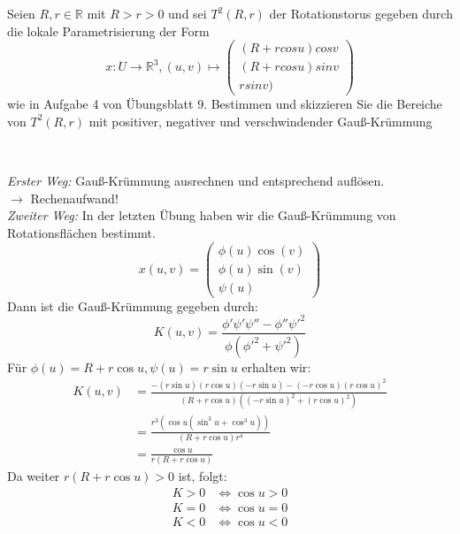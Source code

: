 \begin{assignment}
 Seien $R, r \in \mathbb{R}$ mit $ R > r > 0$ und sei $T^2(R,r)$  der Rotationstorus gegeben durch die lokale Parametrisierung der Form
 \begin{equation*}
   x: U \to \mathbb{R}^3, (u,v) \mapsto \begin{pmatrix}
   (R + rcos u) cosv \\
   (R + rcosu) sinv \\
   r sinv)
   \end{pmatrix}
 \end{equation*}
wie in Aufgabe 4 von Übungsblatt 9. Bestimmen und skizzieren Sie die Bereiche von $T^2(R,r)$ mit positiver, negativer und verschwindender Gauß-Krümmung 
\end{assignment}
\begin{solution}
\
\end{solution}
  \emph{Erster Weg:} Gauß-Krümmung ausrechnen und entsprechend auflösen. \\
  \( \rightarrow \) Rechenaufwand! \\
  \emph{Zweiter Weg:} In der letzten Übung haben wir die Gauß-Krümmung von Rotationsflächen bestimmt.
  \begin{equation*}
    x(u,v) = \begin{pmatrix}
      \phi(u) \cos(v) \\
      \phi(u) \sin(v) \\
      \psi(u) 
    \end{pmatrix}
  \end{equation*}
  Dann ist die Gauß-Krümmung gegeben durch: 
  \begin{equation*} 
    K(u,v) = \frac{\phi' \psi' \psi'' - \phi'' \psi'^2}{\phi(\phi'^2 + \psi'^2)}
  \end{equation*}
  Für \( \phi(u) = R + r \cos u, \psi(u) = r \sin u \) erhalten wir:
  \begin{align*}
    K(u,v) &= \frac{-(r \sin u)(r \cos u)(-r \sin u)-(-r \cos u){(r \cos u)}^2}{(R+r \cos u)({(-r \sin u)}^2 + {(r \cos u)}^2)} \\
    &= \frac{r^3(\cos u(\sin^3u + \cos^3 u))}{ (R + r \cos u) r^4} \\
    &= \frac{\cos u}{r(R+r \cos u)} 
  \end{align*}
  Da weiter \( r(R + r \cos u) > 0 \) ist, folgt: 
  \begin{align*}
    K > 0 &\Leftrightarrow \cos u > 0 \\
    K = 0 &\Leftrightarrow \cos u = 0 \\
    K < 0 &\Leftrightarrow \cos u < 0
  \end{align*}

